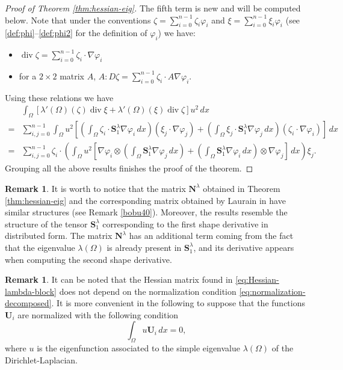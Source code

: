 \documentclass[11pt]{article}
\numberwithin{equation}{section}\newtheorem*{jepEnonce}{\jepEnonceTitle}\newenvironment{enonce*}[1]{\def\jepEnonceTitle{#1}\jepEnonce}{\endjepEnonce}\newtheorem*{conj*}{Conjecture}
\theoremstyle{plain}
\theoremstyle{definition}
\newtheorem{rem}[thm]{Remark}
\newcommand{\di}{\operatorname{div}}
\newcommand{\bo}[1]{{\boldsymbol#1}}
\begin{document}
\begin{proof}[Proof of Theorem \ref{thm:hessian-eig}]
The fifth term is new and will be computed below. Note that under the conventions $\zeta = \sum_{i=0}^{n-1} \zeta_i \varphi_i$ and $\xi = \sum_{i=0}^{n-1} \xi_i \varphi_i$ (see \eqref{def:phi}--\eqref{def:phi2} for the definition of $\varphi_i$) we have:
\begin{itemize}
\item $\di \zeta = \sum_{i=0}^{n-1} \zeta_i \cdot \nabla \varphi_i$
\item for a $2\times 2$ matrix $A$, $A : D\zeta = \sum_{i=0}^{n-1} \zeta_i \cdot A\nabla \varphi_i$.
\end{itemize}
Using these relations we have
\begin{align*} &\int_\Omega [\lambda'(\Omega)(\zeta) \di \xi +\lambda'(\Omega)(\xi)\di \zeta] u^2\, dx\\
= & \sum_{i,j=0}^{n-1} \int_\Omega u^2 \left[\left(\int_\Omega \zeta_i \cdot \bo S_1^\lambda \nabla \varphi_i\, dx \right)(\xi_j \cdot \nabla \varphi_j)+\left(\int_\Omega \xi_j \cdot \bo S_1^\lambda \nabla \varphi_j\, dx \right)(\zeta_i \cdot \nabla \varphi_i)\right]\, dx\\
= & \sum_{i,j=0}^{n-1} \zeta_i\cdot \left(\int_\Omega u^2\left[\nabla \varphi_i \otimes \left(\int_\Omega \bo S_1^\lambda \nabla \varphi_j\, dx \right)
+ \left(\int_\Omega \bo S_1^\lambda \nabla \varphi_i\, dx\right)\otimes \nabla \varphi_j \right]\, dx\right) \xi_j.
\end{align*}
Grouping all the above results finishes the proof of the theorem.
\end{proof}

\begin{rem}
It is worth to notice that the matrix $\bo N^\lambda$ obtained in Theorem \ref{thm:hessian-eig} and the corresponding matrix obtained by Laurain in \cite[Prop.\,14]{laurain2ndDeriv} have similar structures (see Remark \ref{bobu40}). Moreover, the results resemble the structure of the tensor $\bo S_1^\lambda$ corresponding to the first shape derivative in distributed form. The matrix $\bo N^\lambda$ has an additional term coming from the fact that the eigenvalue $\lambda(\Omega)$ is already present in $\bo S_1^\lambda$, and its derivative appears when computing the second shape derivative.
\end{rem}

\begin{rem}
It can be noted that the Hessian matrix found in \eqref{eq:Hessian-lambda-block} does not depend on the normalization condition \eqref{eq:normalization-decomposed}. It is more convenient in the following to suppose that the functions $\bo U_i$ are normalized with the following condition
\begin{equation}
\int_\Omega u \bo U_i\, dx = 0,
\label{eq:normalization-alternative}
\end{equation}
where $u$ is the eigenfunction associated to the simple eigenvalue $\lambda(\Omega)$ of the Dirichlet-Laplacian.
\end{rem}
\end{document}
